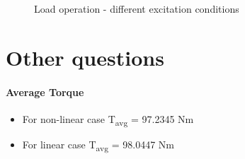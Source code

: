 \documentclass[a4paper,11pt]{article}
\begin{document}
\begin{figure}[h!]
  \centering
  \quad
  \caption{Load operation - different excitation conditions}
\end{figure}

\section{Other questions}
\paragraph*{Average Torque}
\begin{itemize}
\item For non-linear case T\textsubscript{avg} = 97.2345 Nm
\item For linear case T\textsubscript{avg} = 98.0447 Nm
\end{itemize}
\end{document}
